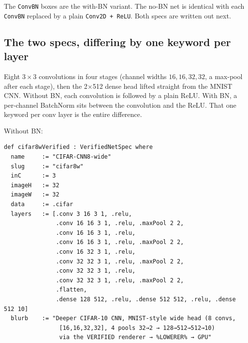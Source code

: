 \begin{center}
\end{center}

\noindent The \texttt{ConvBN} boxes are the with-BN variant. The no-BN
net is identical with each \texttt{ConvBN} replaced by a plain
\texttt{Conv2D~+~ReLU}. Both specs are written out next.

\subsection*{The two specs, differing by one keyword per layer}

Eight $3 \times 3$ convolutions in four stages (channel widths
$16, 16, 32, 32$, a max-pool after each stage), then the 2$\times$512
dense head lifted straight from the MNIST CNN. Without BN, each
convolution is followed by a plain ReLU. With
BN, a per-channel BatchNorm sits between the convolution and the ReLU.
That one keyword per conv layer is the entire difference.

Without BN:

\begin{verbatim}
def cifar8wVerified : VerifiedNetSpec where
  name     := "CIFAR-CNN8-wide"
  slug     := "cifar8w"
  inC      := 3
  imageH   := 32
  imageW   := 32
  data     := .cifar
  layers   := [.conv 3 16 3 1, .relu,
               .conv 16 16 3 1, .relu, .maxPool 2 2,
               .conv 16 16 3 1, .relu,
               .conv 16 16 3 1, .relu, .maxPool 2 2,
               .conv 16 32 3 1, .relu,
               .conv 32 32 3 1, .relu, .maxPool 2 2,
               .conv 32 32 3 1, .relu,
               .conv 32 32 3 1, .relu, .maxPool 2 2,
               .flatten,
               .dense 128 512, .relu, .dense 512 512, .relu, .dense 512 10]
  blurb    := "Deeper CIFAR-10 CNN, MNIST-style wide head (8 convs,
                [16,16,32,32], 4 pools 32→2 → 128→512→512→10)
                via the VERIFIED renderer → %LOWERER% → GPU"
\end{verbatim}

